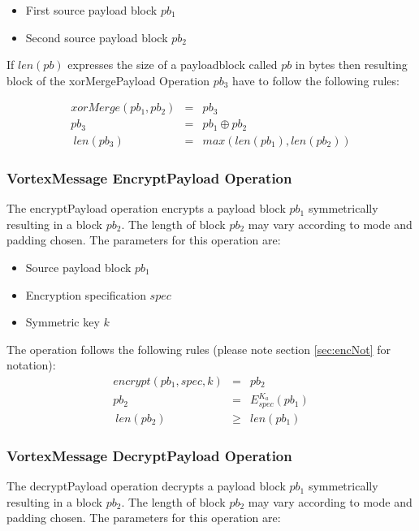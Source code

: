 \begin{itemize}
	\item First source payload block $pb_1$
	\item Second source payload block $pb_2$
\end{itemize}

If $len(pb)$ expresses the size of a payloadblock called $pb$ in bytes then resulting block of the xorMergePayload Operation $pb_3$ have to follow the following rules:

\begin{eqnarray}
xorMerge(pb_1, pb_2) & = & pb_3 \\
pb_3 & = & pb_1 \oplus pb_2\\\
len(pb_3) & = & max( len(pb_1), len(pb_2) )
\end{eqnarray}


\subsubsection{VortexMessage EncryptPayload Operation}
The encryptPayload operation encrypts a payload block $pb_1$ symmetrically resulting in a block $pb_2$. The length of block $pb_2$ may vary according to mode and padding chosen. The parameters for this operation are:

\begin{itemize}
	\item Source payload block $pb_1$
	\item Encryption specification $spec$
	\item Symmetric key $k$
\end{itemize}

The operation follows the following rules (please note section \ref{sec:encNot} for notation):
\begin{eqnarray}
encrypt(pb_1, spec, k) & = & pb_2 \\
pb_2 & = & E_{spec}^{K_a}\left( pb_1 \right)\\\
len(pb_2) & \geq & len(pb_1)
\end{eqnarray}


\subsubsection{VortexMessage DecryptPayload Operation}
The decryptPayload operation decrypts a payload block $pb_1$ symmetrically resulting in a block $pb_2$. The length of block $pb_2$ may vary according to mode and padding chosen. The parameters for this operation are:

